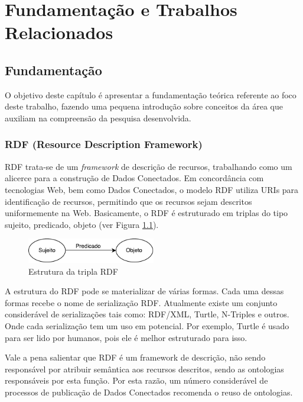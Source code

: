 \chapter{Fundamentação e Trabalhos Relacionados}
\label{cap:fundamentacao}

\section{Fundamentação}
O objetivo deste capítulo é apresentar a fundamentação teórica referente ao foco deste trabalho, fazendo uma pequena introdução  sobre conceitos da área que auxiliam na compreensão da pesquisa desenvolvida.

\subsection{RDF (Resource Description Framework)}

RDF trata-se de um \textit{framework} de descrição de recursos, trabalhando como um alicerce para a construção de Dados Conectados. Em concordância com tecnologias Web, bem como Dados Conectados, o modelo RDF utiliza URIs para identificação de recursos, permitindo que os recursos sejam descritos uniformemente na Web. Basicamente, o RDF é estruturado em triplas do tipo sujeito, predicado, objeto (ver Figura \ref{fig:spo}). 

\begin{figure}[!ht]
	\centering
	\includegraphics[width=0.5\textwidth]{./imagens/Sujeito-predicado-objeto.pdf}
    \caption{Estrutura da tripla RDF}
	\label{fig:spo}
\end{figure}

A estrutura do RDF pode se materializar de várias formas. Cada uma dessas formas recebe o nome de serialização RDF. Atualmente existe um conjunto considerável de serializações tais como: RDF/XML, Turtle, N-Triples e outros. Onde cada serialização tem um uso em potencial. Por exemplo, Turtle é usado para ser lido por humanos, pois ele é melhor estruturado para isso. 

Vale a pena salientar que RDF é um framework de descrição, não sendo responsável por atribuir semântica aos recursos descritos, sendo as ontologias responsáveis por esta função. Por esta razão, um número considerável de processos de publicação de Dados Conectados \cite{bizer2007publish, hyland2011joy, villazon2011methodological, Avila2015} recomenda o reuso de ontologias. 

